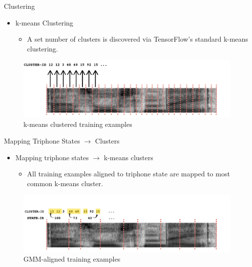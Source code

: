 \documentclass[final]{beamer} %
\begin{document}
\begin{frame}
\begin{columns}
\begin{column}{0.3\textwidth}
{\begin{block}{\boxnumber Clustering}
          \begin{itemize}
          \item k-means Clustering
            \begin{itemize}
            \item A set number of clusters is discovered via TensorFlow's standard k-means clustering.
            \end{itemize}
          \end{itemize}
        \end{block}

        \vspace{.5cm}
        
        \begin{figure}[!htbp]
          \centering
          \includegraphics[width=\linewidth]{figs/clustered.png}
          \caption{k-means clustered training examples}
          \endminipage\hfill
        \end{figure}
        
        \vspace{.5cm}
        
        \begin{block}{\boxnumber Mapping Triphone States $\rightarrow$ Clusters}          
          \begin{itemize}
          \item Mapping triphone states $\rightarrow$ k-means clusters
            \begin{itemize}
            \item All training examples aligned to triphone state are mapped to most common k-means cluster.
            \end{itemize}
          \end{itemize}
        \end{block}

        \vspace{.5cm}
        
        \begin{figure}[!htbp]
          \centering
          \includegraphics[width=\linewidth]{figs/mapped.png}
          \caption{GMM-aligned training examples}
          \endminipage\hfill
        \end{figure}
        
}
\end{column}
\end{columns}
\end{frame}
\end{document}
